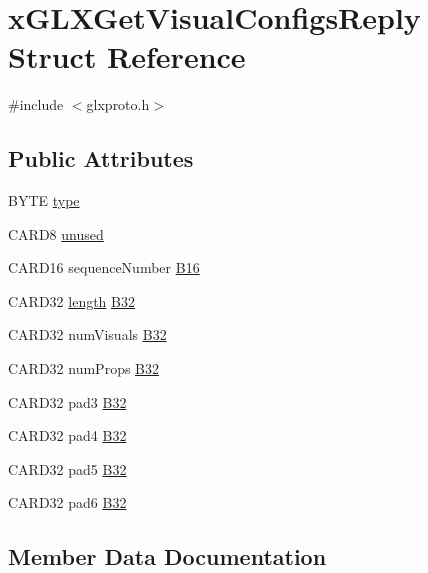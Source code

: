 \hypertarget{structx_g_l_x_get_visual_configs_reply}{}\section{x\+G\+L\+X\+Get\+Visual\+Configs\+Reply Struct Reference}
\label{structx_g_l_x_get_visual_configs_reply}


{\ttfamily \#include $<$glxproto.\+h$>$}

\subsection*{Public Attributes}
\begin{DoxyCompactItemize}
\item 
B\+Y\+TE \hyperlink{structx_g_l_x_get_visual_configs_reply_a13e8d478bf965cf64f202483720c1392}{type}
\item 
C\+A\+R\+D8 \hyperlink{structx_g_l_x_get_visual_configs_reply_a2ede37d9829354c21a3b89912911e9c7}{unused}
\item 
C\+A\+R\+D16 sequence\+Number \hyperlink{structx_g_l_x_get_visual_configs_reply_a31fad73707c99fd85557f979489aac1e}{B16}
\item 
C\+A\+R\+D32 \hyperlink{glcorearb_8h_ab9c919755bde3b34349e23a32b4e0fa7}{length} \hyperlink{structx_g_l_x_get_visual_configs_reply_ab1dd08a1de88a8ff43cfd12151e4b763}{B32}
\item 
C\+A\+R\+D32 num\+Visuals \hyperlink{structx_g_l_x_get_visual_configs_reply_a0c5f6f2246d7cd10f4e4ec0ed5a38c92}{B32}
\item 
C\+A\+R\+D32 num\+Props \hyperlink{structx_g_l_x_get_visual_configs_reply_ad917d3b7de80b28c2065a5545eafb543}{B32}
\item 
C\+A\+R\+D32 pad3 \hyperlink{structx_g_l_x_get_visual_configs_reply_ace74cef5dadacf7d2215b0b1fafecaf1}{B32}
\item 
C\+A\+R\+D32 pad4 \hyperlink{structx_g_l_x_get_visual_configs_reply_a2e43a743c1287611e5467950de43347a}{B32}
\item 
C\+A\+R\+D32 pad5 \hyperlink{structx_g_l_x_get_visual_configs_reply_aaa369ec0a2e4616196e860dacc1d42f7}{B32}
\item 
C\+A\+R\+D32 pad6 \hyperlink{structx_g_l_x_get_visual_configs_reply_aeddc0cf4a7a9b5917d9d5a80a2ae039e}{B32}
\end{DoxyCompactItemize}


\subsection{Member Data Documentation}
\mbox{\label{structx_g_l_x_get_visual_configs_reply_a31fad73707c99fd85557f979489aac1e}} 
